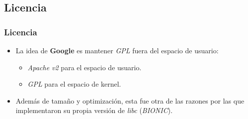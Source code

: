 \subsection{Licencia}
\begin{frame}
  \frametitle{Licencia}
  \begin{itemize}
      \item La idea de \textbf{Google} es mantener \textit{GPL} fuera del espacio de usuario:
      \begin{itemize}
    \item \textit{Apache v2} para el espacio de usuario.
    
    \item \textit{GPL} para el espacio de kernel.
      \end{itemize}
      
      \item Además de tamaño y optimización, esta fue otra de las razones por las que implementaron su propia versión de \textit{libc} (\textit{BIONIC}).
  \end{itemize}
\end{frame}